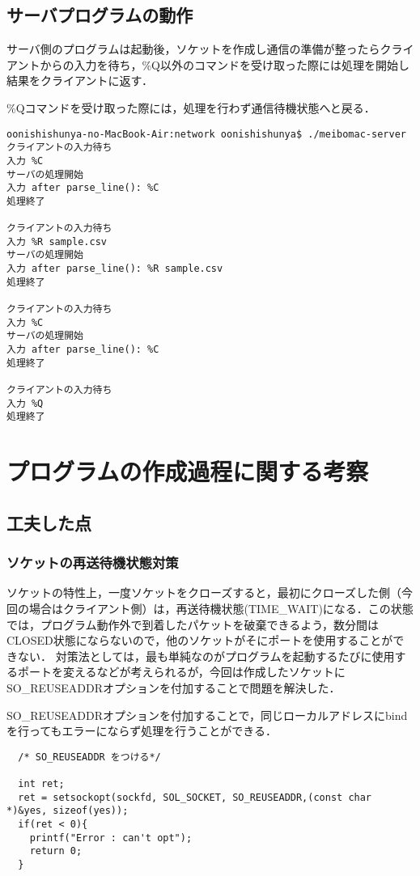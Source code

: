 \documentclass[a4j]{jarticle}
\begin{document}
\subsection{サーバプログラムの動作}
サーバ側のプログラムは起動後，ソケットを作成し通信の準備が整ったらクライアントからの入力を待ち，\%Q以外のコマンドを受け取った際には処理を開始し結果をクライアントに返す．

\%Qコマンドを受け取った際には，処理を行わず通信待機状態へと戻る．
\begin{verbatim}
oonishishunya-no-MacBook-Air:network oonishishunya$ ./meibomac-server 
クライアントの入力待ち 
入力 %C
サーバの処理開始 
入力 after parse_line(): %C
処理終了

クライアントの入力待ち 
入力 %R sample.csv
サーバの処理開始 
入力 after parse_line(): %R sample.csv
処理終了

クライアントの入力待ち 
入力 %C
サーバの処理開始 
入力 after parse_line(): %C
処理終了

クライアントの入力待ち 
入力 %Q
処理終了
\end{verbatim}
\section{プログラムの作成過程に関する考察}

\subsection{工夫した点}
\subsubsection{ソケットの再送待機状態対策}
ソケットの特性上，一度ソケットをクローズすると，最初にクローズした側（今回の場合はクライアント側）は，再送待機状態(TIME\_WAIT)になる．この状態では，プログラム動作外で到着したパケットを破棄できるよう，数分間はCLOSED状態にならないので，他のソケットがそにポートを使用することができない．
対策法としては，最も単純なのがプログラムを起動するたびに使用するポートを変えるなどが考えられるが，今回は作成したソケットにSO\_REUSEADDRオプションを付加することで問題を解決した．

SO\_REUSEADDRオプションを付加することで，同じローカルアドレスにbindを行ってもエラーにならず処理を行うことができる．

\begin{verbatim}
  /* SO_REUSEADDR をつける*/

  int ret;
  ret = setsockopt(sockfd, SOL_SOCKET, SO_REUSEADDR,(const char *)&yes, sizeof(yes));
  if(ret < 0){
    printf("Error : can't opt");
    return 0;
  }
  \end{verbatim}
\end{document}
